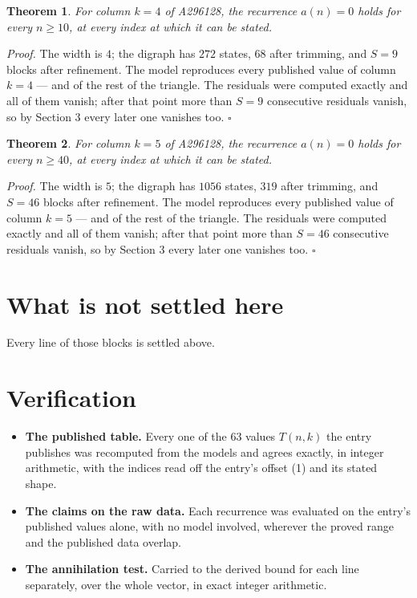 \documentclass[11pt]{article}
\newtheorem{theorem}{Theorem}
\theoremstyle{definition}
\begin{document}
\begin{theorem} For column $k = 4$ of A296128, the recurrence $a(n) = 0$ holds for every $n \ge 10$, at every index at which it can be stated.\end{theorem}

{\itshape Proof.} The width is $4$; the digraph has $272$ states, $68$ after trimming, and $S = 9$ blocks after refinement. The model reproduces every published value of column $k = 4$ --- and of the rest of the triangle. The residuals were computed exactly and all of them vanish; after that point more than $S = 9$ consecutive residuals vanish, so by Section 3 every later one vanishes too. $\square$

\begin{theorem} For column $k = 5$ of A296128, the recurrence $a(n) = 0$ holds for every $n \ge 40$, at every index at which it can be stated.\end{theorem}

{\itshape Proof.} The width is $5$; the digraph has $1056$ states, $319$ after trimming, and $S = 46$ blocks after refinement. The model reproduces every published value of column $k = 5$ --- and of the rest of the triangle. The residuals were computed exactly and all of them vanish; after that point more than $S = 46$ consecutive residuals vanish, so by Section 3 every later one vanishes too. $\square$

\section{What is not settled here}

Every line of those blocks is settled above.

\section{Verification}

\begin{itemize}

\item {\bfseries The published table.} Every one of the 63 values $T(n,k)$ the entry publishes was recomputed from the models and agrees exactly, in integer arithmetic, with the indices read off the entry's offset (1) and its stated shape.

\item {\bfseries The claims on the raw data.} Each recurrence was evaluated on the entry's published values alone, with no model involved, wherever the proved range and the published data overlap.

\item {\bfseries The annihilation test.} Carried to the derived bound for each line separately, over the whole vector, in exact integer arithmetic.

\end{itemize}
\end{document}
